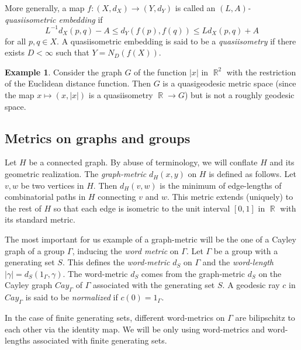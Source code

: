 \documentclass[12pt]{amsbook}%
\theoremstyle{definition}
\newtheorem{example}[thm]{Example}
\theoremstyle{remark}
\numberwithin{section}{chapter}
\numberwithin{subsection}{section}
\numberwithin{figure}{chapter}
\DeclareMathOperator{\R}{\mathbb{R}}
\def\Ga{\Gamma}
\def\ga{\gamma}
\begin{document}
More generally, a map $f: (X,d_X)\to (Y,d_Y)$ is called an 
{\em $(L,A)$-quasiisometric embedding} 
if 
 $$
 L^{-1} d_X(p,q) -A\leqslant d_Y(f(p), f(q))\leqslant Ld_X(p,q)+A  
$$
for all $p, q\in X$. A quasiisometric embedding is said to be a {\em quasiisometry}  
if there exists $D<\infty$ such that 
 $Y=N_D(f(X))$. 
 
 \begin{example}
 Consider the graph $G$ of the function $|x|$ in $\R^2$ with the restriction of the Euclidean distance function. Then $G$ is a quasigeodesic metric space 
 (since the map $x\mapsto (x, |x|)$ is a quasiisometry $\R\to G$) but is not a roughly geodesic space.  
 \end{example}

\subsection{Metrics on graphs and groups}

Let $H$ be a connected graph. By abuse of terminology, we will conflate $H$ and its geometric realization. 
The {\em graph-metric} $d_H(x,y)$ on  $H$ is defined as follows. Let $v, w$ be two vertices in $H$. Then $d_H(v,w)$  
is the minimum of edge-lengths of combinatorial paths in $H$ connecting $v$ and $w$. This metric extends (uniquely) to the rest of $H$ so that each edge is isometric to the unit interval $[0,1]$ in $\R$ with its standard metric. 




\medskip
The most important for us example of a graph-metric will be the one of a Cayley graph of a group $\Ga$, inducing the 
{\em word metric} on $\Ga$. Let $\Ga$ be a group with a generating set $S$. This defines the {\em word-metric} $d_S$ on $\Ga$ and the {\em word-length}  
$|\ga|=d_S(1_\Ga, \ga)$. The word-metric $d_S$ comes from the graph-metric $d_S$ on the Cayley graph $Cay_\Ga$ \index{$Cay_\Ga$, Cayley graph} 
of $\Ga$ associated with the generating set $S$. A geodesic ray $c$ in $Cay_\Ga$ is said to be {\em normalized} if $c(0)=1_\Ga$. 

In the case of finite generating sets, different word-metrics on $\Ga$ are bilipschitz to each other via the identity map. 
We will be only using word-metrics and word-lengths associated with finite generating sets. 

\end{document}
